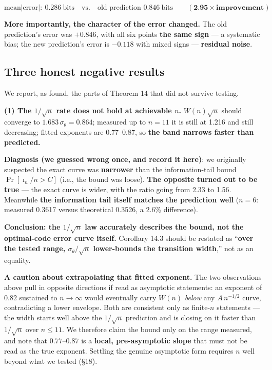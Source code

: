 \documentclass[11pt]{article}
\renewenvironment{quote}
  {\def\FrameCommand{{\color{gray!60}\vrule width 2pt}\hspace{8pt}}%
   \MakeFramed{\advance\hsize-\width \FrameRestore}\begin{itshape}}
  {\end{itshape}\endMakeFramed}
\begin{document}
\[\text{mean}|\text{error}|:\ \mathbf{0.286}\ \text{bits}\quad\text{vs.}\quad\text{old prediction }0.846\ \text{bits}\qquad(\textbf{2.95$\times$improvement})\]

\textbf{More importantly, the character of the error changed.} The old prediction's error was \(+0.846\), with all six points \textbf{the same sign} --- a systematic bias; the new prediction's error is \(-0.118\) with mixed signs --- \textbf{residual noise}.

\hypertarget{three-honest-negative-results}{%
\subsection{Three honest negative results}\label{three-honest-negative-results}}

We report, as found, the parts of Theorem 14 that did not survive testing.

\textbf{(1) The \(1/\sqrt n\) rate does not hold at achievable \(n\).} \(W(n)\sqrt n\) should converge to \(1.683\,\sigma_\theta=0.864\); measured up to \(n=11\) it is still at 1.216 and still decreasing; fitted exponents are 0.77--0.87, so \textbf{the band narrows faster than predicted.}

\textbf{Diagnosis (we guessed wrong once, and record it here)}: we originally suspected the exact curve was \textbf{narrower} than the information-tail bound \(\Pr[\imath_n/n>C]\) (i.e., the bound was loose). \textbf{The opposite turned out to be true} --- the exact curve is wider, with the ratio going from 2.33 to 1.56. Meanwhile \textbf{the information tail itself matches the prediction well} (\(n=6\): measured 0.3617 versus theoretical 0.3526, a 2.6\% difference).

\begin{quote}
\textbf{Conclusion: the \(1/\sqrt n\) law accurately describes the bound, not the optimal-code error curve itself.} Corollary 14.3 should be restated as ``\textbf{over the tested range, \(\sigma_\theta/\sqrt n\) lower-bounds the transition width},'' not as an equality.
\end{quote}

\textbf{A caution about extrapolating that fitted exponent.} The two observations above pull in opposite directions if read as asymptotic statements: an exponent of \(0.82\) sustained to \(n\to\infty\) would eventually carry \(W(n)\) \emph{below} any \(A\,n^{-1/2}\) curve, contradicting a lower envelope. Both are consistent only as finite-\(n\) statements --- the width starts well above the \(1/\sqrt n\) prediction and is closing on it faster than \(1/\sqrt n\) over \(n\le11\). We therefore claim the bound only on the range measured, and note that \(0.77\)--\(0.87\) is a \textbf{local, pre-asymptotic slope} that must not be read as the true exponent. Settling the genuine asymptotic form requires \(n\) well beyond what we tested (\S{}18).
\end{document}
